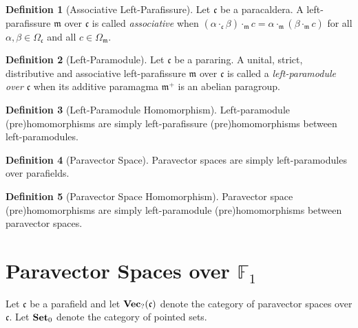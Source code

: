 \documentclass{article}
\theoremstyle{definition}
\newtheorem{definition}{Definition}[section]
\begin{document}
\begin{definition}[Associative Left-Parafissure]
Let \(\mathfrak{c}\) be a paracaldera. A left-parafissure \(\mathfrak{m}\) over \(\mathfrak{c}\) is called \textit{associative} when \((\alpha\cdot_\mathfrak{c}\beta)\cdot_\mathfrak{m}c=\alpha\cdot_\mathfrak{m}(\beta\cdot_\mathfrak{m}c)\) for all \(\alpha,\beta\in\Omega_\mathfrak{c}\) and all \(c\in\Omega_\mathfrak{m}\).
\end{definition}

\begin{definition}[Left-Paramodule]
Let \(\mathfrak{c}\) be a pararing. A unital, strict, distributive and associative left-parafissure \(\mathfrak{m}\) over \(\mathfrak{c}\) is called a \textit{left-paramodule over} \(\mathfrak{c}\) when its additive paramagma \(\mathfrak{m}^+\) is an abelian paragroup.
\end{definition}


\begin{definition}[Left-Paramodule Homomorphism]
Left-paramodule (pre)homomorphisms are simply left-parafissure (pre)homomorphisms between left-paramodules.
\end{definition}

\begin{definition}[Paravector Space]
Paravector spaces are simply left-paramodules over parafields.
\end{definition}

\begin{definition}[Paravector Space Homomorphism]
Paravector space (pre)homomorphisms are simply left-paramodule (pre)homomorphisms between paravector spaces.
\end{definition}

\section{Paravector Spaces over \texorpdfstring{\(\mathbb{F}_1\)}{F1}}

Let \(\mathfrak{c}\) be a parafield and let \(\text{\bf Vec}_?(\mathfrak{c})\) denote the category of paravector spaces over \(\mathfrak{c}\). Let \(\text{\bf Set}_0\) denote the category of pointed sets.
\end{document}
